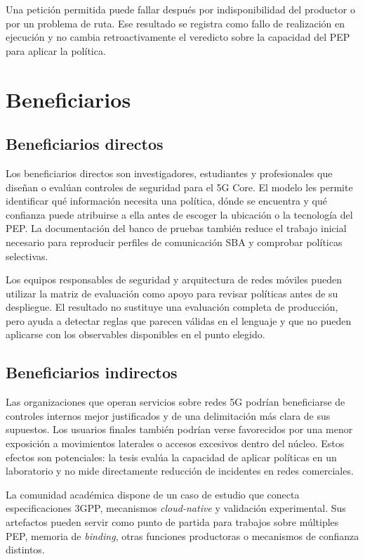 Una petición permitida puede fallar después por indisponibilidad del productor o por un problema de ruta. Ese resultado se registra como fallo de realización en ejecución y no cambia retroactivamente el veredicto sobre la capacidad del PEP para aplicar la política.

\section{Beneficiarios}
\label{sec:beneficiarios-cap1}

\subsection{Beneficiarios directos}

Los beneficiarios directos son investigadores, estudiantes y profesionales que diseñan o evalúan controles de seguridad para el 5G Core. El modelo les permite identificar qué información necesita una política, dónde se encuentra y qué confianza puede atribuirse a ella antes de escoger la ubicación o la tecnología del PEP. La documentación del banco de pruebas también reduce el trabajo inicial necesario para reproducir perfiles de comunicación SBA y comprobar políticas selectivas.

Los equipos responsables de seguridad y arquitectura de redes móviles pueden utilizar la matriz de evaluación como apoyo para revisar políticas antes de su despliegue. El resultado no sustituye una evaluación completa de producción, pero ayuda a detectar reglas que parecen válidas en el lenguaje y que no pueden aplicarse con los observables disponibles en el punto elegido.

\subsection{Beneficiarios indirectos}

Las organizaciones que operan servicios sobre redes 5G podrían beneficiarse de controles internos mejor justificados y de una delimitación más clara de sus supuestos. Los usuarios finales también podrían verse favorecidos por una menor exposición a movimientos laterales o accesos excesivos dentro del núcleo. Estos efectos son potenciales: la tesis evalúa la capacidad de aplicar políticas en un laboratorio y no mide directamente reducción de incidentes en redes comerciales.

La comunidad académica dispone de un caso de estudio que conecta especificaciones 3GPP, mecanismos \textit{cloud-native} y validación experimental. Sus artefactos pueden servir como punto de partida para trabajos sobre múltiples PEP, memoria de \textit{binding}, otras funciones productoras o mecanismos de confianza distintos.

